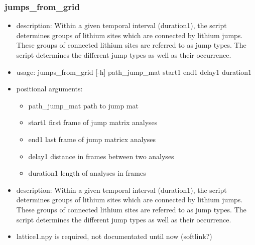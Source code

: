 \documentclass{article}
\begin{document}
\subsubsection{jumps\_from\_grid}
\begin{itemize}
\item description: Within a given temporal interval (duration1), the script determines groups of lithium sites which are connected by lithium jumps. These groups of connected lithium sites are referred to as jump types. The script determines the different jump types as well as  their occurrence.

\item  usage: jumps\_from\_grid [-h]   path\_jump\_mat start1 end1 delay1 duration1

 \item  positional arguments:
 \begin{itemize}
\item    path\_jump\_mat         path to jump mat
\item    start1                first frame of jump matrix analyses
\item   end1                  last frame of jump matricx analyses
\item    delay1                distance in frames between two analyses
\item   duration1             length of analyses in frames
\end{itemize}
\item description: Within a given temporal interval (duration1), the script determines groups of lithium sites which are connected by lithium jumps. These groups of connected lithium sites are referred to as jump types. The script determines the different jump types as well as  their occurrence.
\item lattice1.npy is required, not documentated until now (softlink?)
\end{itemize}
\end{document}
